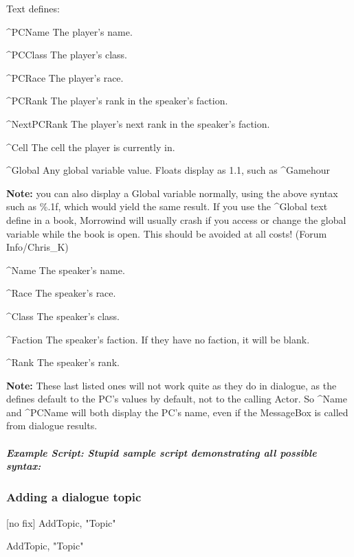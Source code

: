 \documentclass[
]{article}
\begin{document}
Text defines:

\^{}PCName The player's name.

\^{}PCClass The player's class.

\^{}PCRace The player's race.

\^{}PCRank The player's rank in the speaker's faction.

\^{}NextPCRank The player's next rank in the speaker's faction.

\^{}Cell The cell the player is currently in.

\^{}Global Any global variable value. Floats display as 1.1, such as
\^{}Gamehour

\textbf{Note:} you can also display a Global variable normally, using
the above syntax such as \%.1f, which would yield the same result. If
you use the \^{}Global text define in a book, Morrowind will usually
crash if you access or change the global variable while the book is
open. This should be avoided at all costs! (Forum Info/Chris\_K)

\^{}Name The speaker's name.

\^{}Race The speaker's race.

\^{}Class The speaker's class.

\^{}Faction The speaker's faction. If they have no faction, it will be
blank.

\^{}Rank The speaker's rank.

\textbf{Note:} These last listed ones will not work quite as they do in
dialogue, as the defines default to the PC's values by default, not to
the calling Actor. So \^{}Name and \^{}PCName will both display the PC's
name, even if the MessageBox is called from dialogue results.

\hypertarget{example-script-stupid-sample-script-demonstrating-all-possible-syntax}{%
\subparagraph{Example Script: Stupid sample script demonstrating all
possible
syntax:}\label{example-script-stupid-sample-script-demonstrating-all-possible-syntax}}




\hypertarget{adding-a-dialogue-topic}{%
\subsubsection{Adding a dialogue topic}\label{adding-a-dialogue-topic}}

{[}no fix{]} AddTopic, "Topic"

AddTopic, "Topic"
\end{document}
